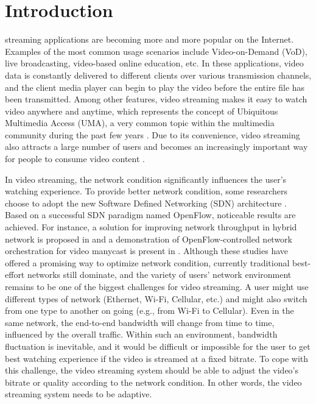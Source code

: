 \documentclass[journal]{IEEEtran}
\begin{document}
\section{Introduction}
\label{sec:intro}
% 
% 
% 
% 
 streaming applications are becoming more and more popular on the Internet. Examples of the most common usage scenarios include Video-on-Demand (VoD), live broadcasting, video-based online education, etc. In these applications, video data is constantly delivered to different clients over various transmission channels, and the client media player can begin to play the video before the entire file has been transmitted. Among other features, video streaming makes it easy to watch video anywhere and anytime, which represents the concept of Ubiquitous Multimedia Access (UMA), a very common topic within the multimedia community during the past few years \cite{Gualdi08}. Due to its convenience, video streaming also attracts a large number of users and becomes an increasingly important way for people to consume video content \cite{Chen13}.

In video streaming, the network condition significantly influences the user's watching experience. To provide better network condition, some researchers choose to adopt the new Software Defined Networking (SDN) architecture \cite{Egilmez14}. Based on a successful SDN paradigm named OpenFlow, noticeable results are achieved. For instance, a solution for improving network throughput in hybrid network is proposed in \cite{Li14} and a demonstration of OpenFlow-controlled network orchestration for video manycast is present in \cite{Xue15}. Although these studies have offered a promising way to optimize network condition, currently traditional best-effort networks still dominate, and the variety of users' network environment remains to be one of the biggest challenges for video streaming. A user might use different types of network (Ethernet, Wi-Fi, Cellular, etc.) and might also switch from one type to another on going (e.g., from Wi-Fi to Cellular). Even in the same network, the end-to-end bandwidth will change from time to time, influenced by the overall traffic. Within such an environment, bandwidth fluctuation is inevitable, and it would be difficult or impossible for the user to get best watching experience if the video is streamed at a fixed bitrate. To cope with this challenge, the video streaming system should be able to adjust the video's bitrate or quality according to the network condition. In other words, the video streaming system needs to be adaptive.
\end{document}
